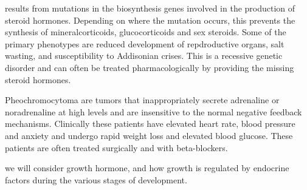 \documentclass{tufte-handout}
\begin{document}
 results from mutations in the biosynthesis genes involved in the production of steroid hormones.  Depending on where the mutation occurs, this prevents the synthesis of mineralcorticoids, glucocorticoids and sex steroids.  Some of the primary phenotypes are reduced development of repdroductive organs, salt wasting, and susceptibility to Addisonian crises.  This is a recessive genetic disorder and can often be treated pharmacologically by providing the missing steroid hormones.

  Pheochromocytoma are tumors that inappropriately secrete adrenaline or noradrenaline at high levels and are insensitive to the normal negative feedback mechanisms.  Clinically these patients have elevated heart rate, blood pressure and anxiety and undergo rapid weight loss and elevated blood glucose.  These patients are often treated surgically and with beta-blockers.

 we will consider growth hormone, and how growth is regulated by endocrine factors during the various stages of development.
\listoffigures
\listoftables



\end{document}
